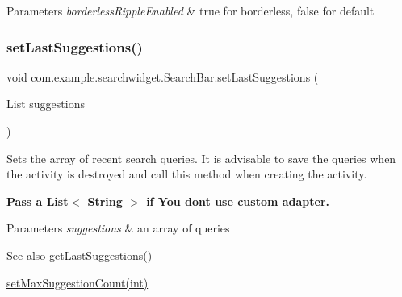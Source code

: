 \begin{DoxyParams}{Parameters}
{\em borderless\+Ripple\+Enabled} & true for borderless, false for default \\
\hline
\end{DoxyParams}
\mbox{\label{classcom_1_1example_1_1searchwidget_1_1_search_bar_a36b0bcb2dd221d8cba1b64955a51b597}} 
\subsubsection{\texorpdfstring{setLastSuggestions()}{setLastSuggestions()}}
{\footnotesize\ttfamily void com.\+example.\+searchwidget.\+Search\+Bar.\+set\+Last\+Suggestions (\begin{DoxyParamCaption}\item[{List}]{suggestions }\end{DoxyParamCaption})}

Sets the array of recent search queries. It is advisable to save the queries when the activity is destroyed and call this method when creating the activity. 

{\bfseries{Pass a List$<$ String $>$ if You don\textquotesingle{}t use custom adapter.}}


\begin{DoxyParams}{Parameters}
{\em suggestions} & an array of queries \\
\hline
\end{DoxyParams}
\begin{DoxySeeAlso}{See also}
\mbox{\hyperlink{classcom_1_1example_1_1searchwidget_1_1_search_bar_a29fff6f8fe5011b1854e4fd4a55ea65f}{get\+Last\+Suggestions()}} 

\mbox{\hyperlink{classcom_1_1example_1_1searchwidget_1_1_search_bar_a0f4236bdaf89946d9bdc0eb982cb7cce}{set\+Max\+Suggestion\+Count(int)}} 
\end{DoxySeeAlso}
\mbox{\label{classcom_1_1example_1_1searchwidget_1_1_search_bar_ad7ebfb25a69de44d845b39a130edcbed}} 
